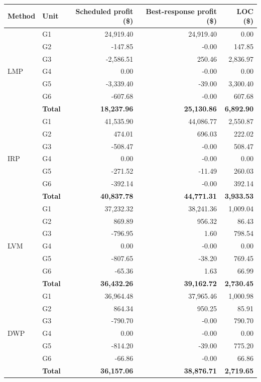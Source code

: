 \begin{tabular}{llrrr}
\toprule
Method & Unit & Scheduled profit (\$) & Best-response profit (\$) & LOC (\$) \\
\midrule
\multirow{7}{*}{LMP} & G1 & 24,919.40 & 24,919.40 & 0.00 \\
 & G2 & -147.85 & -0.00 & 147.85 \\
 & G3 & -2,586.51 & 250.46 & 2,836.97 \\
 & G4 & 0.00 & -0.00 & 0.00 \\
 & G5 & -3,339.40 & -39.00 & 3,300.40 \\
 & G6 & -607.68 & -0.00 & 607.68 \\
 & \textbf{Total} & \textbf{18,237.96} & \textbf{25,130.86} & \textbf{6,892.90} \\
\midrule
\multirow{7}{*}{IRP} & G1 & 41,535.90 & 44,086.77 & 2,550.87 \\
 & G2 & 474.01 & 696.03 & 222.02 \\
 & G3 & -508.47 & -0.00 & 508.47 \\
 & G4 & 0.00 & -0.00 & 0.00 \\
 & G5 & -271.52 & -11.49 & 260.03 \\
 & G6 & -392.14 & -0.00 & 392.14 \\
 & \textbf{Total} & \textbf{40,837.78} & \textbf{44,771.31} & \textbf{3,933.53} \\
\midrule
\multirow{7}{*}{LVM} & G1 & 37,232.32 & 38,241.36 & 1,009.04 \\
 & G2 & 869.89 & 956.32 & 86.43 \\
 & G3 & -796.95 & 1.60 & 798.54 \\
 & G4 & 0.00 & -0.00 & 0.00 \\
 & G5 & -807.65 & -38.20 & 769.45 \\
 & G6 & -65.36 & 1.63 & 66.99 \\
 & \textbf{Total} & \textbf{36,432.26} & \textbf{39,162.72} & \textbf{2,730.45} \\
\midrule
\multirow{7}{*}{DWP} & G1 & 36,964.48 & 37,965.46 & 1,000.98 \\
 & G2 & 864.34 & 950.25 & 85.91 \\
 & G3 & -790.70 & -0.00 & 790.70 \\
 & G4 & 0.00 & -0.00 & 0.00 \\
 & G5 & -814.20 & -39.00 & 775.20 \\
 & G6 & -66.86 & -0.00 & 66.86 \\
 & \textbf{Total} & \textbf{36,157.06} & \textbf{38,876.71} & \textbf{2,719.65} \\

\end{tabular}
